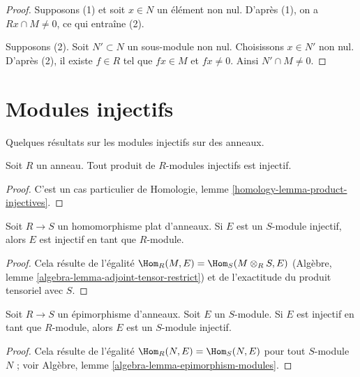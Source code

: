 \begin{proof}
Supposons (1) et soit $x \in N$ un élément non nul. D'après (1), on a
$Rx \cap M \not = 0$, ce qui entraîne (2).

\medskip\noindent
Supposons (2). Soit $N' \subset N$ un sous-module non nul. Choisissons $x \in N'$
non nul. D'après (2), il existe $f \in R$ tel que $fx \in M$ et $fx \not = 0$.
Ainsi $N' \cap M \not = 0$.
\end{proof}




\section{Modules injectifs}
\label{section-injective-modules}

\noindent
Quelques résultats sur les modules injectifs sur des anneaux.

\begin{lemma}
\label{lemma-product-injectives}
Soit $R$ un anneau. Tout produit de $R$-modules injectifs est injectif.
\end{lemma}

\begin{proof}
C'est un cas particulier de Homologie, lemme \ref{homology-lemma-product-injectives}.
\end{proof}

\begin{lemma}
\label{lemma-injective-flat}
Soit $R \to S$ un homomorphisme plat d'anneaux. Si $E$ est un $S$-module injectif,
alors $E$ est injectif en tant que $R$-module.
\end{lemma}

\begin{proof}
Cela résulte de l'égalité $\Hom_R(M, E) = \Hom_S(M \otimes_R S, E)$
(Algèbre, lemme \ref{algebra-lemma-adjoint-tensor-restrict})
et de l'exactitude du produit tensoriel avec $S$.
\end{proof}

\begin{lemma}
\label{lemma-injective-epimorphism}
Soit $R \to S$ un épimorphisme d'anneaux. Soit $E$ un $S$-module.
Si $E$ est injectif en tant que $R$-module, alors $E$ est un $S$-module injectif.
\end{lemma}

\begin{proof}
Cela résulte de l'égalité $\Hom_R(N, E) = \Hom_S(N, E)$ pour tout $S$-module $N$ ;
voir Algèbre, lemme \ref{algebra-lemma-epimorphism-modules}.
\end{proof}

